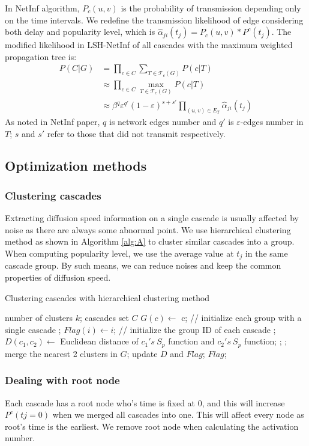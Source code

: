 \begin{itemize}
\quad In NetInf algorithm, $P_c(u,v)$ is the probability of transmission depending only on the time intervals. We redefine the transmission likelihood of edge considering both delay and popularity level, which is $\hat{\alpha}_{ji}(t_j)=P_c(u,v)*P^c(t_j)$. 
The modified likelihood in LSH-NetInf of all cascades with the maximum weighted propagation tree is:
\begin{equation}
\begin{aligned}
P(C|G)&=\prod_{c\in C} \sum_{T\in \mathcal{T}_c(G)}P(c|T) \\
&\approx \prod_{c\in C} \max_{T\in \mathcal{T}_c(G)}P(c|T) \nonumber \\
&\approx \beta^q \varepsilon^{q'} (1-\varepsilon)^{s+s'}\prod_{(u,v)\in E_{T}}\hat{\alpha}_{ji}(t_j)
\end{aligned}
\end{equation}
As noted in NetInf paper, $q$ is network edges number and $q'$ is $\varepsilon$-edges number in $T$; $s$ and $s'$ refer to those that did not transmit respectively.
\end{itemize}
\subsection{Optimization methods}
\subsubsection{Clustering cascades}
Extracting diffusion speed information on a single cascade is usually affected by noise as there are always some abnormal point. We use hierarchical clustering method as shown in Algorithm \ref{alg:A} to cluster similar cascades into a group. When computing popularity level, we use the average value at $t_j$ in the same cascade group. By such means, we can reduce noises and keep the common properties of diffusion speed.
\begin{algorithm}[h]
\caption{Clustering cascades with hierarchical clustering method}
\label{alg:A}
\begin{algorithmic}
\REQUIRE number of clusters $k$; cascades set $C$
\STATE $G(c)\leftarrow$ c; // initialize each group with a single cascade
\ENDFOR;
\STATE $Flag(i)\leftarrow i$; // initialize the group ID of each cascade
\ENDFOR;
\STATE $D(c_1,c_2)\leftarrow$ Euclidean distance of $c_1's~S_p$ function and $c_2's~S_p$ function; 
\ENDFOR;
\ENDFOR;
\STATE merge the nearest 2 clusters in $G$;
\STATE update $D$ and $Flag$;
\ENDWHILE
\RETURN $Flag$;
\end{algorithmic}
\end{algorithm}
\subsubsection{Dealing with root node} 
Each cascade has a root node who's time is fixed at 0, and this will increase $P^c(tj=0)$ when we merged all cascades into one. This will affect every node as root's time is the earliest. We remove root node when calculating the activation number.